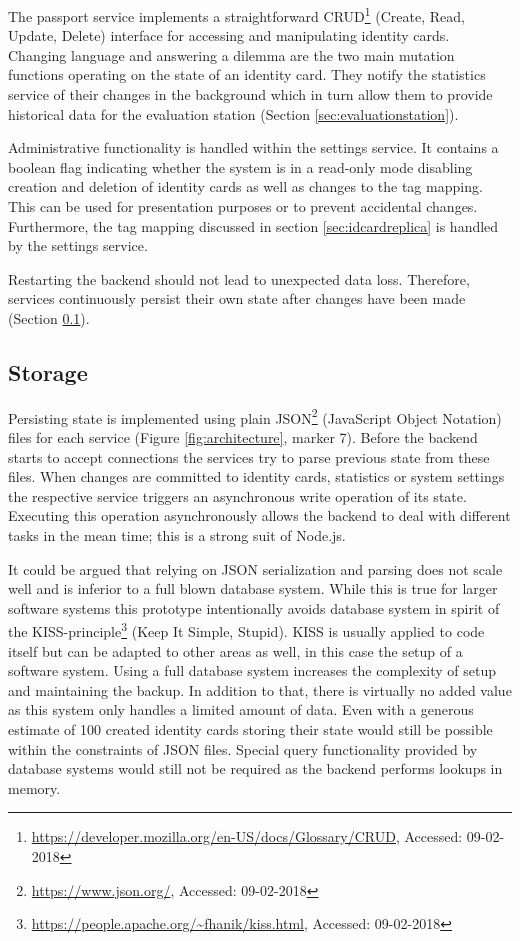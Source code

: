 The passport service implements a straightforward CRUD\footnote{\url{https://developer.mozilla.org/en-US/docs/Glossary/CRUD}, Accessed: 09-02-2018} (Create, Read, Update, Delete) interface for accessing and manipulating identity cards.
Changing language and answering a dilemma are the two main mutation functions operating on the state of an identity card.
They notify the statistics service of their changes in the background which in turn allow them to provide historical data for the evaluation station (Section \ref{sec:evaluationstation}).

Administrative functionality is handled within the settings service.
It contains a boolean flag indicating whether the system is in a read-only mode disabling creation and deletion of identity cards as well as changes to the tag mapping.
This can be used for presentation purposes or to prevent accidental changes.
Furthermore, the tag mapping discussed in section \ref{sec:idcardreplica} is handled by the settings service.

Restarting the backend should not lead to unexpected data loss.
Therefore, services continuously persist their own state after changes have been made (Section \ref{sec:storage}).


\subsection{Storage} \label{sec:storage}
Persisting state is implemented using plain JSON\footnote{\url{https://www.json.org/}, Accessed: 09-02-2018} (JavaScript Object Notation) files for each service (Figure \ref{fig:architecture}, marker 7).
Before the backend starts to accept connections the services try to parse previous state from these files.
When changes are committed to identity cards, statistics or system settings the respective service triggers an asynchronous write operation of its state.
Executing this operation asynchronously allows the backend to deal with different tasks in the mean time; this is a strong suit of Node.js.

It could be argued that relying on JSON serialization and parsing does not scale well and is inferior to a full blown database system.
While this is true for larger software systems this prototype intentionally avoids database system in spirit of the KISS-principle\footnote{\url{https://people.apache.org/~fhanik/kiss.html}, Accessed: 09-02-2018} (Keep It Simple, Stupid).
KISS is usually applied to code itself but can be adapted to other areas as well, in this case the setup of a software system.
Using a full database system increases the complexity of setup and maintaining the backup.
In addition to that, there is virtually no added value as this system only handles a limited amount of data.
Even with a generous estimate of 100 created identity cards storing their state would still be possible within the constraints of JSON files.
Special query functionality provided by database systems would still not be required as the backend performs lookups in memory.



